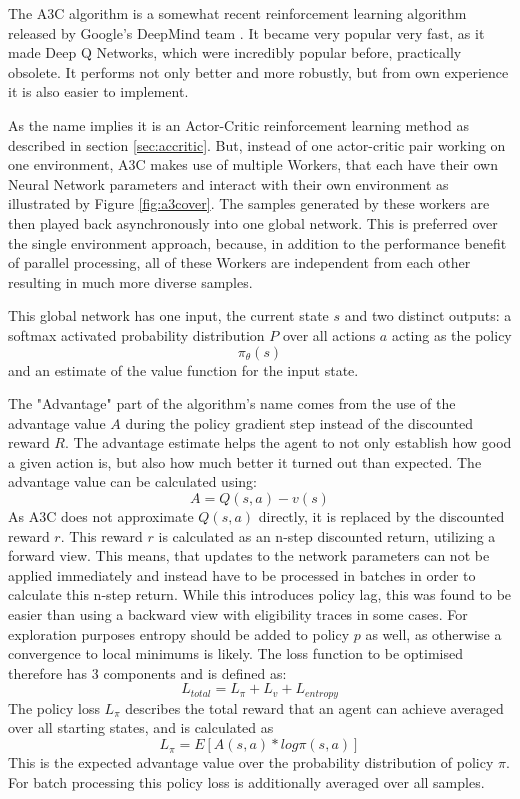 The A3C algorithm is a somewhat recent reinforcement learning algorithm released by Google's DeepMind team \citep{DBLP:journals/corr/a3c}. It became very popular very fast, as it made Deep Q Networks, which were incredibly popular before, practically obsolete. It performs not only better and more robustly, but from own experience it is also easier to implement.

As the name implies it is an Actor-Critic reinforcement learning method as described in section \ref{sec:accritic}. But, instead of one actor-critic pair working on one environment, A3C makes use of multiple Workers, that each have their own Neural Network parameters and interact with their own environment as illustrated by Figure \ref{fig:a3cover}. The samples generated by these workers are then played back asynchronously into one global network. This is preferred over the single environment approach, because, in addition to the performance benefit of parallel processing, all of these Workers are independent from each other resulting in much more diverse samples.

This global network has one input, the current state $s$ and two distinct outputs: a softmax activated probability distribution $P$ over all actions $a$ acting as the policy 
$$\pi_\theta(s)$$
and an estimate of the value function for the input state.

The "Advantage" part of the algorithm's name comes from the use of the advantage value $A$ during the policy gradient step instead of the discounted reward $R$. The advantage estimate helps the agent to not only establish how good a given action is, but also how much better it turned out than expected.
The advantage value can be calculated using:
$$A = Q(s, a) - v(s)$$ 
As A3C does not approximate $Q(s, a)$ directly, it is replaced by the discounted reward $r$.
This reward $r$ is calculated as an n-step discounted return, utilizing a forward view. This means, that updates to the network parameters can not be applied immediately and instead have to be processed in batches in order to calculate this n-step return. While this introduces policy lag, this was found to be easier than using a backward view with eligibility traces in some cases.
For exploration purposes entropy should be added to policy $p$ as well, as otherwise a convergence to local minimums is likely. The loss function to be optimised therefore has 3 components and is defined as: 
$$L_{total} = L_{\pi} + L_{v} + L_{entropy}$$
The policy loss $L_{\pi}$ describes the total reward that an agent can achieve averaged over all starting states, and is calculated as
$$L_\pi = E[A(s, a) * log \pi(s, a)]$$
This is the expected advantage value over the probability distribution of policy $\pi$. For batch processing this policy loss is additionally averaged over all samples.

